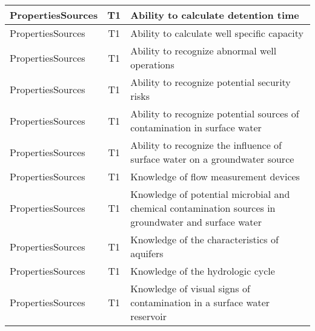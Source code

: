 \documentclass{article}
\begin{document}
\begin{table}[]
\begin{tabular}{|l|c|l|}
PropertiesSources                      & T1             & Ability to calculate   detention time                                                                                             \\ \hline
PropertiesSources                      & T1             & Ability to calculate   well specific capacity                                                                                     \\ \hline
PropertiesSources                      & T1             & Ability to recognize   abnormal well operations                                                                                   \\ \hline
PropertiesSources                      & T1             & Ability to recognize   potential security risks                                                                                   \\ \hline
PropertiesSources                      & T1             & Ability to recognize   potential sources of contamination in surface water                                                        \\ \hline
PropertiesSources                      & T1             & Ability to recognize   the influence of surface water on a groundwater source                                                     \\ \hline
PropertiesSources                      & T1             & Knowledge of flow   measurement devices                                                                                           \\ \hline
PropertiesSources                      & T1             & Knowledge of   potential microbial and chemical contamination sources in groundwater and   surface water                          \\ \hline
PropertiesSources                      & T1             & Knowledge of the   characteristics of aquifers                                                                                    \\ \hline
PropertiesSources                      & T1             & Knowledge of the   hydrologic cycle                                                                                               \\ \hline
PropertiesSources                      & T1             & Knowledge of visual   signs of contamination in a surface water reservoir                                                         \\ \hline

\end{tabular}
\end{table}
\end{document}
